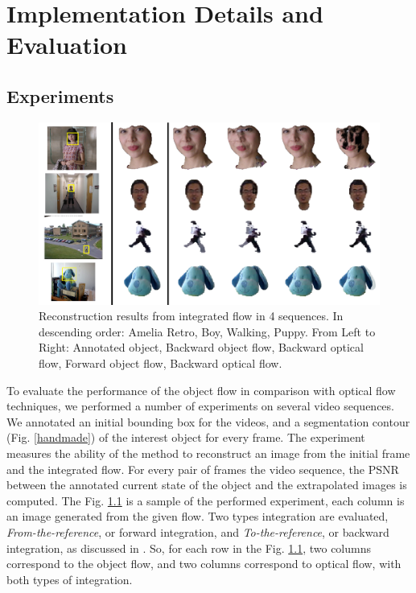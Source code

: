 \chapter{Implementation Details and Evaluation} \label{chap:results}

\section{Experiments}

   \begin{figure}[th]
      \centering
      \includegraphics[width=1.0\textwidth]{../images/extrapolated.png}
      \caption{Reconstruction results from integrated flow in 4 sequences. In descending order: Amelia Retro, Boy, Walking, Puppy. From Left to Right: Annotated object, Backward object flow, Backward optical flow, Forward object flow, Backward optical flow.}
      \label{sample}
   \end{figure}

To evaluate the performance of the object flow in comparison with optical flow techniques, we performed 
a number of experiments on several video sequences. We annotated an initial bounding box for the videos, 
and a segmentation contour (Fig. \ref{handmade}) of the interest object for every frame. The experiment measures the ability of the method to 
reconstruct an image from the initial frame and the integrated flow. For every pair of frames the video sequence, the PSNR between the annotated
current state of the object and the extrapolated images is computed. The Fig. \ref{sample} is a sample of the performed experiment, each column is an image generated from the given flow. 
Two types integration are evaluated, {\it From-the-reference}, or forward integration, and {\it To-the-reference}, or backward integration, as discussed in \cite{c20}. So, for each row in the Fig. \ref{sample}, two columns correspond to the object flow, and two columns correspond to optical flow, with both types of integration.

